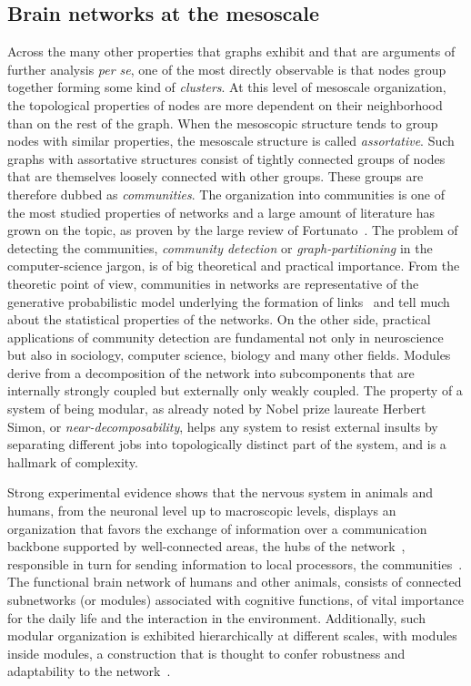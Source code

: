 \subsection{Brain networks at the mesoscale}
Across the many other properties that graphs exhibit and that are arguments of further analysis \emph{per se}, one of the most directly observable is that nodes group together forming some kind of \emph{clusters}.
At this level of mesoscale organization, the topological properties of nodes are more dependent on their neighborhood than on the rest of the graph. When the mesoscopic structure tends to group nodes with similar properties, the mesoscale structure is called \emph{assortative}. Such graphs with assortative structures consist of tightly connected groups of nodes that are themselves loosely connected with other groups. These groups are therefore dubbed as \emph{communities}. 
The organization into communities is one of the most studied properties of networks and a large amount of literature has grown on the topic, as proven by the large review of Fortunato~\cite{fortunato2010}.
The problem of detecting the communities, \emph{community detection} or \emph{graph-partitioning} in the computer-science jargon, is of big theoretical and practical importance.
From the theoretic point of view, communities in networks are representative of the generative probabilistic model underlying the formation of links~\cite{karrer2011} and tell much about the statistical properties of the networks.
On the other side, practical applications of community detection are fundamental not only in neuroscience but also in sociology, computer science, biology and many other fields.
Modules derive from a decomposition of the network into subcomponents that are internally strongly coupled but externally only weakly coupled. The property of a system of being modular, as already noted by Nobel prize laureate Herbert Simon, or \emph{near-decomposability}, helps any system to resist external insults by separating different jobs into topologically distinct part of the system, and is a hallmark of complexity.

Strong experimental evidence shows that the nervous system in animals and humans, from the neuronal level up to macroscopic levels, displays an organization that favors the exchange of information over a communication backbone supported by well-connected areas, the hubs of the network~\cite{dereus2013a}, responsible in turn for sending information to local processors, the communities~\cite{vandenheuvel2013a}.
The functional brain network of humans and other animals, consists of connected subnetworks (or modules) associated with cognitive functions, of vital importance for the daily life and the interaction in the environment.
Additionally, such modular organization is exhibited hierarchically at different scales, with modules inside modules, a construction that is thought to confer robustness and adaptability to the network~\cite{meunier2010}. 

